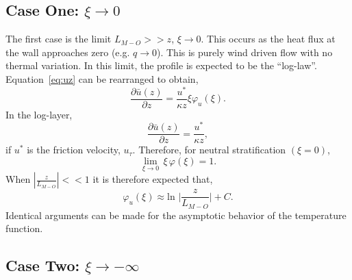 %

\subsection*{Case One: $\xi \to 0$}
The first case is the limit
$L_{M-O}>>z$, $\xi \to 0$. This occurs as the heat flux
at the wall approaches zero (e.g. $q \to 0$). 
This is purely wind driven flow with no thermal variation. 
In this limit, the profile is expected to be the ``log-law''. 
Equation~\ref{eq:uz} can be rearranged to obtain, 
\begin{equation}
 \frac{\partial \bar u(z)}{\partial z} = \frac{u^*}{\kappa z} \xi \varphi_u(\xi).
\end{equation}
In the log-layer, 
\begin{equation}
 \frac{\partial \bar u(z)}{\partial z} = \frac{u^*}{\kappa z},
\end{equation}
if $u^*$ is the friction velocity, $u_{\tau}$. 
Therefore, for neutral stratification $(\xi = 0)$, 
\begin{equation}
 \lim_{\xi \to 0} \, \xi \, \varphi(\xi)= 1. 
\end{equation}
When $ |\frac{z}{L_{M-O}}| << 1$ it is therefore expected that,
\begin{equation}
 \varphi_u(\xi) \approx \text{ln } \rvert \frac{z}{L_{M-O}} \rvert + C.
\end{equation}
Identical arguments can be made for the asymptotic 
behavior of the temperature function.

\subsection*{Case Two: $\xi \to -\infty$}

